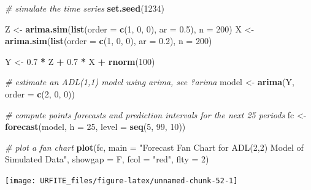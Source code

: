 \documentclass[]{book}
\newenvironment{Shaded}{\begin{snugshade}}{\end{snugshade}}
\newcommand{\KeywordTok}[1]{\textcolor[rgb]{0.13,0.29,0.53}{\textbf{#1}}}
\newcommand{\DataTypeTok}[1]{\textcolor[rgb]{0.13,0.29,0.53}{#1}}
\newcommand{\DecValTok}[1]{\textcolor[rgb]{0.00,0.00,0.81}{#1}}
\newcommand{\FloatTok}[1]{\textcolor[rgb]{0.00,0.00,0.81}{#1}}
\newcommand{\StringTok}[1]{\textcolor[rgb]{0.31,0.60,0.02}{#1}}
\newcommand{\CommentTok}[1]{\textcolor[rgb]{0.56,0.35,0.01}{\textit{#1}}}
\newcommand{\OperatorTok}[1]{\textcolor[rgb]{0.81,0.36,0.00}{\textbf{#1}}}
\newcommand{\NormalTok}[1]{#1}
\theoremstyle{definition}
\theoremstyle{definition}
\theoremstyle{definition}
\theoremstyle{remark}
\begin{document}
\begin{Shaded}
\begin{Highlighting}[]
\CommentTok{# simulate the time series}
\KeywordTok{set.seed}\NormalTok{(}\DecValTok{1234}\NormalTok{)}

\NormalTok{Z <-}\StringTok{ }\KeywordTok{arima.sim}\NormalTok{(}\KeywordTok{list}\NormalTok{(}\DataTypeTok{order =} \KeywordTok{c}\NormalTok{(}\DecValTok{1}\NormalTok{, }\DecValTok{0}\NormalTok{, }\DecValTok{0}\NormalTok{), }\DataTypeTok{ar =} \FloatTok{0.5}\NormalTok{),  }\DataTypeTok{n =} \DecValTok{200}\NormalTok{)}
\NormalTok{X <-}\StringTok{ }\KeywordTok{arima.sim}\NormalTok{(}\KeywordTok{list}\NormalTok{(}\DataTypeTok{order =} \KeywordTok{c}\NormalTok{(}\DecValTok{1}\NormalTok{, }\DecValTok{0}\NormalTok{, }\DecValTok{0}\NormalTok{), }\DataTypeTok{ar =} \FloatTok{0.2}\NormalTok{),  }\DataTypeTok{n =} \DecValTok{200}\NormalTok{)}

\NormalTok{Y <-}\StringTok{ }\FloatTok{0.7} \OperatorTok{*}\StringTok{ }\NormalTok{Z }\OperatorTok{+}\StringTok{ }\FloatTok{0.7} \OperatorTok{*}\StringTok{ }\NormalTok{X }\OperatorTok{+}\StringTok{ }\KeywordTok{rnorm}\NormalTok{(}\DecValTok{100}\NormalTok{)}

\CommentTok{# estimate an ADL(1,1) model using arima, see ?arima}
\NormalTok{model <-}\StringTok{ }\KeywordTok{arima}\NormalTok{(Y, }\DataTypeTok{order =} \KeywordTok{c}\NormalTok{(}\DecValTok{2}\NormalTok{, }\DecValTok{0}\NormalTok{, }\DecValTok{0}\NormalTok{))}

\CommentTok{# compute points forecasts and prediction intervals for the next 25 periods}
\NormalTok{fc <-}\StringTok{ }\KeywordTok{forecast}\NormalTok{(model, }\DataTypeTok{h =} \DecValTok{25}\NormalTok{, }\DataTypeTok{level =} \KeywordTok{seq}\NormalTok{(}\DecValTok{5}\NormalTok{, }\DecValTok{99}\NormalTok{, }\DecValTok{10}\NormalTok{))}

\CommentTok{# plot a fan chart}
\KeywordTok{plot}\NormalTok{(fc, }
     \DataTypeTok{main =} \StringTok{"Forecast Fan Chart for ADL(2,2) Model of Simulated Data"}\NormalTok{, }
     \DataTypeTok{showgap =}\NormalTok{ F, }
     \DataTypeTok{fcol =} \StringTok{"red"}\NormalTok{,}
     \DataTypeTok{flty =} \DecValTok{2}\NormalTok{)}
\end{Highlighting}
\end{Shaded}

\begin{center}\texttt{[image: URFITE\_files/figure-latex/unnamed-chunk-52-1]} \end{center}
\end{document}
